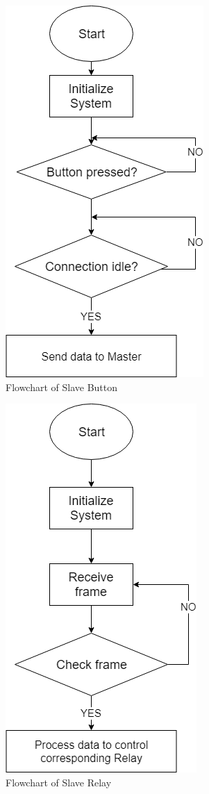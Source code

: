     \begin{figure}[!htb]
        \begin{center}
        \includegraphics[scale=0.55]{images/buttonFlow.png}
        \caption{Flowchart of Slave Button}
        \label{fig:buttonFlow}
        \end{center}
    \end{figure}
    \begin{figure}[!htb]
        \begin{center}
        \includegraphics[scale=0.55]{images/relayFlow.png}
        \caption{Flowchart of Slave Relay}
        \label{fig:relayFlow}
        \end{center}
    \end{figure}

